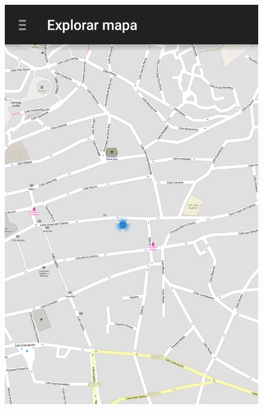 \begin{slide}
  \begin{center}
    \begin{figure}[!h]
      \includegraphics[height=0.8\textheight]{img/sinprec.png}
      \hspace{0.5cm}

\end{figure}
\end{center}
\end{slide}
